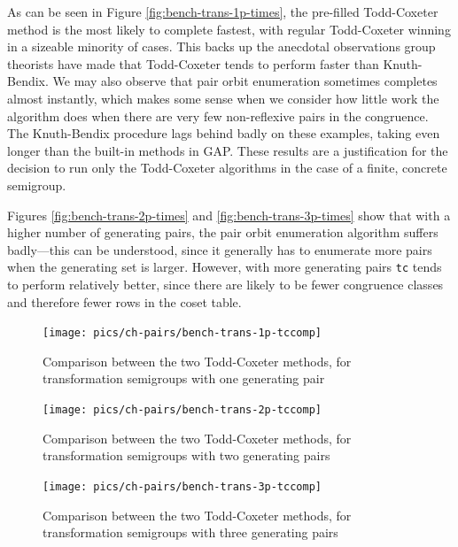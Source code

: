 As can be seen in Figure \ref{fig:bench-trans-1p-times}, the pre-filled Todd-Coxeter
method is the most likely to complete fastest, with regular Todd-Coxeter winning
in a sizeable minority of cases.  This backs up the anecdotal observations group
theorists have made \cite{havascomparing} that Todd-Coxeter tends to perform
faster than Knuth-Bendix.  We may also observe that pair orbit enumeration
sometimes completes almost instantly, which makes some sense when we consider
how little work the algorithm does when there are very few non-reflexive pairs
in the congruence.  The Knuth-Bendix procedure lags behind badly on these
examples, taking even longer than the built-in methods in GAP.  These results
are a justification for the decision to run only the Todd-Coxeter algorithms in
the case of a finite, concrete semigroup.

Figures \ref{fig:bench-trans-2p-times} and \ref{fig:bench-trans-3p-times} show
that with a higher number of generating pairs, the pair orbit enumeration
algorithm suffers badly---this can be understood, since it generally has to
enumerate more pairs when the generating set is larger.  However, with more
generating pairs \texttt{tc} tends to perform relatively better, since there are
likely to be fewer congruence classes and therefore fewer rows in the coset
table.

\begin{figure}[h]
  \centering
  \texttt{[image: pics/ch-pairs/bench-trans-1p-tccomp]}
  \caption{Comparison between the two Todd-Coxeter methods, for transformation
    semigroups with one generating pair}
  \label{fig:bench-trans-1p-tccomp}
\end{figure}

\begin{figure}[h]
  \centering
  \texttt{[image: pics/ch-pairs/bench-trans-2p-tccomp]}
  \caption{Comparison between the two Todd-Coxeter methods, for transformation
    semigroups with two generating pairs}
  \label{fig:bench-trans-2p-tccomp}
\end{figure}

\begin{figure}[h]
  \centering
  \texttt{[image: pics/ch-pairs/bench-trans-3p-tccomp]}
  \caption{Comparison between the two Todd-Coxeter methods, for transformation
    semigroups with three generating pairs}
  \label{fig:bench-trans-3p-tccomp}
\end{figure}

